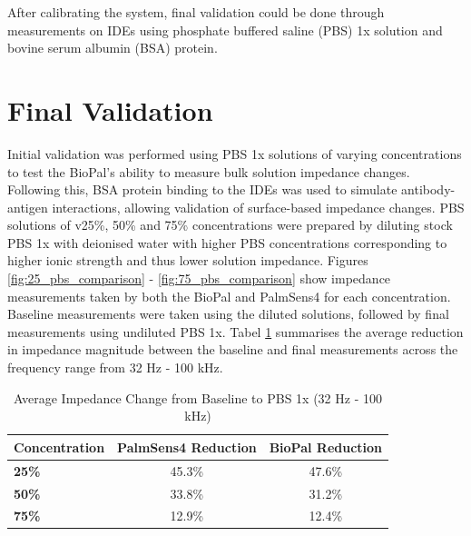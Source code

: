 After calibrating the system, final validation could be done through measurements on \acp{IDE} using phosphate buffered saline (PBS) 1x solution and bovine serum albumin (BSA) protein.

\section{Final Validation}

Initial validation was performed using PBS 1x solutions of varying concentrations to test the BioPal's ability to measure bulk solution impedance changes. Following this, BSA protein binding to the \acp{IDE} was used to simulate antibody-antigen interactions, allowing validation of surface-based impedance changes.
PBS solutions of v25\%, 50\% and 75\% concentrations were prepared by diluting stock PBS 1x with deionised water with higher PBS concentrations corresponding to higher ionic strength and thus lower solution impedance. Figures \ref{fig:25_pbs_comparison} - \ref{fig:75_pbs_comparison} show impedance measurements taken by both the BioPal and PalmSens4 for each concentration. Baseline measurements were taken using the diluted solutions, followed by final measurements using undiluted PBS 1x. Tabel \ref{tab:pbs} summarises the average reduction in impedance magnitude between the baseline and final measurements across the frequency range from 32 Hz - 100 kHz.

\begin{table}[H]
\centering
\caption{Average Impedance Change from Baseline to PBS 1x (32 Hz - 100 kHz)}
\label{tab:pbs}
\begin{tabular}{lcc}
\hline
\textbf{Concentration} & \textbf{PalmSens4 Reduction} & \textbf{BioPal Reduction} \\
\hline
\textbf{25\%} & 45.3\% & 47.6\% \\
\textbf{50\%} & 33.8\% & 31.2\% \\
\textbf{75\%} & 12.9\% & 12.4\% \\
\hline
\end{tabular}
\end{table}

